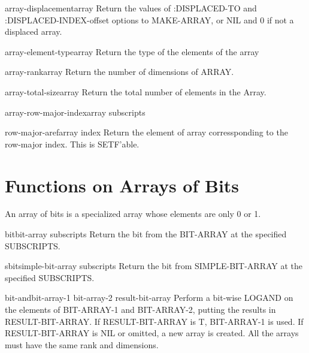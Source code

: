 \documentclass[10pt,english]{book}
\begin{document}
\begin{function}{array-displacement}{array}
  Return the values of :DISPLACED-TO and :DISPLACED-INDEX-offset
   options to MAKE-ARRAY, or NIL and 0 if not a displaced array.
\end{function}

\begin{function}{array-element-type}{array}
  Return the type of the elements of the array
\end{function}

\begin{function}{array-rank}{array}
  Return the number of dimensions of ARRAY.
\end{function}

\begin{function}{array-total-size}{array}
  Return the total number of elements in the Array.
\end{function}

\begin{function}{array-row-major-index}{array \rest subscripts}
  
\end{function}

\begin{accessor}{row-major-aref}{array index}
  Return the element of array corressponding to the row-major index. This is
   SETF'able.
\end{accessor}

\section{Functions on Arrays of Bits}
\label{sec:funct-arrays-bits}

An array of bits is a specialized array whose elements are only 0 or
1.

\begin{accessor}{bit}{bit-array \rest subscripts}
  Return the bit from the BIT-ARRAY at the specified SUBSCRIPTS.
\end{accessor}

\begin{accessor}{sbit}{simple-bit-array \rest subscripts}
  Return the bit from SIMPLE-BIT-ARRAY at the specified SUBSCRIPTS.
\end{accessor}

\begin{function}{bit-and}{bit-array-1 bit-array-2 \op result-bit-array}
  Perform a bit-wise LOGAND on the elements of BIT-ARRAY-1 and BIT-ARRAY-2,
  putting the results in RESULT-BIT-ARRAY. If RESULT-BIT-ARRAY is T,
  BIT-ARRAY-1 is used. If RESULT-BIT-ARRAY is NIL or omitted, a new array is
  created. All the arrays must have the same rank and dimensions.
\end{function}
\end{document}

